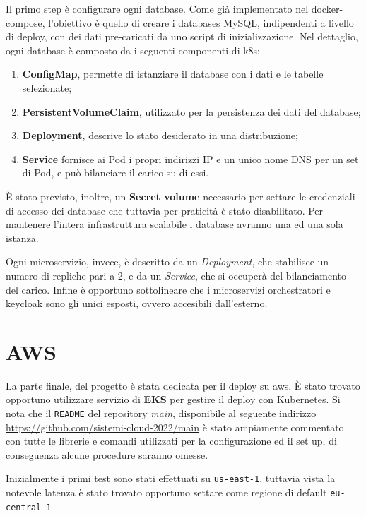 \documentclass{article}
\begin{document}
Il primo step è configurare ogni database. Come già implementato nel docker-compose,
l’obiettivo è quello di creare i databases MySQL, indipendenti a livello di deploy, con dei dati pre-caricati da uno script di inizializzazione.
Nel dettaglio, ogni database è composto da i seguenti componenti di k8s:
\begin{enumerate}
    \item \textbf{ConfigMap}, permette di istanziare il database con i dati e le tabelle selezionate;
    \item \textbf{PersistentVolumeClaim}, utilizzato per la persistenza dei dati del database;
    \item \textbf{Deployment}, descrive lo stato desiderato in una distribuzione;
    \item \textbf{Service} fornisce ai Pod i propri indirizzi IP e un unico nome DNS per un set di Pod, e può bilanciare il carico su di essi.

\end{enumerate}

È stato previsto, inoltre, un \textbf{Secret volume} necessario per settare le credenziali di accesso dei database che tuttavia per praticità è stato disabilitato. Per mantenere l'intera infrastruttura
scalabile i database avranno una ed una sola istanza.

Ogni microservizio, invece, è descritto da un \textit{Deployment}, che stabilisce un numero di repliche pari a 2, e da un \textit{Service}, che si occuperà del bilanciamento del carico. Infine è opportuno sottolineare che i microservizi orchestratori e keycloak sono gli unici esposti, ovvero accesibili dall'esterno.


\section{AWS}

La parte finale, del progetto è stata dedicata per il deploy su aws.
È stato trovato opportuno utilizzare servizio di \textbf{EKS} per gestire il deploy con Kubernetes. Si nota che il \texttt{README} del repository \textit{main},
disponibile al seguente indirizzo \href{https://github.com/sistemi-cloud-2022/main}{https://github.com/sistemi-cloud-2022/main}
è stato ampiamente commentato con tutte le librerie e comandi 
utilizzati per la configurazione ed il set up, di conseguenza alcune procedure saranno omesse.


Inizialmente i primi test sono stati effettuati su \texttt{us-east-1}, tuttavia vista la notevole latenza è stato trovato opportuno settare come regione di default \texttt{eu-central-1}
\end{document}
